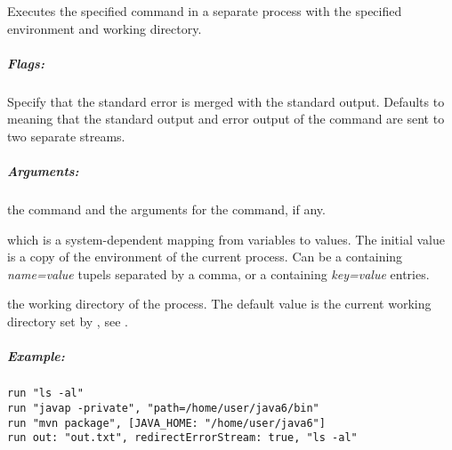 \label{par:run}

Executes the specified command in a separate process with the
specified environment and working directory.

\subparagraph{Flags:}

\begin{asparaitem}
%
\item[\code{redirectErrorStream: true|false}] Specify  that
the standard error is merged with the standard output. Defaults to 
meaning that the standard output and error output of the command are sent to
two separate streams.
%
\end{asparaitem}

\subparagraph{Arguments:}

\begin{asparaitem}
%
\item[\partype{cmd}] the command and the arguments for the command, if any.
%
\item[\partype{envp}] which is a system-dependent mapping from variables
to values. The initial value is a copy of the environment of the current
process. Can be a  containing \emph{name=value} tupels
separated by a comma, or a  containing \emph{key=value} entries.
%
\item[\partype{dir}] the working directory of the process. The default value
is the current working directory set by , see .
%
\end{asparaitem}

\subparagraph{Example:}

\begin{lstlisting}[style=Groovybash, label={lst:example_exit}]
run "ls -al"
run "javap -private", "path=/home/user/java6/bin"
run "mvn package", [JAVA_HOME: "/home/user/java6"]
run out: "out.txt", redirectErrorStream: true, "ls -al"
\end{lstlisting}

